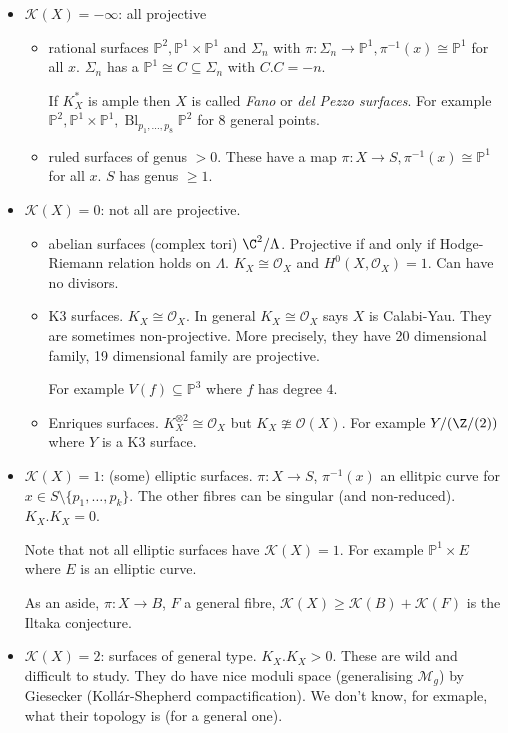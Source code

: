 \documentclass[a4paper]{article}
\renewcommand{\P}{\mathbb P} %
\DeclareMathOperator{\Bl}{Bl} %
\begin{document}
\begin{itemize}
\item \(\mathcal K(X) = -\infty\): all projective
  \begin{itemize}
  \item rational surfaces \(\P^2, \P^1 \times \P^1\) and \(\Sigma_n\) with \(\pi: \Sigma_n \to \P^1, \pi^{-1}(x) \cong \P^1\) for all \(x\). \(\Sigma_n\) has a \(\P^1 \cong C \subseteq \Sigma_n\) with \(C.C = -n\).
    \begin{remark}
      If \(K_X^*\) is ample then \(X\) is called \emph{Fano} or \emph{del Pezzo surfaces}. For example \(\P^2, \P^1 \times \P^1, \Bl_{p_1, \dots, p_8} \P^2\) for 8 general points.
    \end{remark}
  \item ruled surfaces of genus \(> 0\). These have a map \(\pi: X \to S, \pi^{-1}(x) \cong \P^1\) for all \(x\). \(S\) has genus \(\geq 1\).
  \end{itemize}
\item \(\mathcal K(X) = 0\): not all are projective.
  \begin{itemize}
  \item abelian surfaces (complex tori) \(\C^2/\Lambda\). Projective if and only if Hodge-Riemann relation holds on \(\Lambda\). \(K_X \cong \mathcal O_X\) and \(H^0(X, \mathcal O_X) = 1\). Can have no divisors.
  \item K3 surfaces. \(K_X \cong \mathcal O_X\). In general \(K_X \cong \mathcal O_X\) says \(X\) is Calabi-Yau. They are sometimes non-projective. More precisely, they have 20 dimensional family, 19 dimensional family are projective.

    For example \(V(f) \subseteq \P^3\) where \(f\) has degree \(4\).
  \item Enriques surfaces. \(K_X^{\otimes 2} \cong \mathcal O_X\) but \(K_X \ncong \mathcal O(X)\). For example \(Y/(\Z/(2))\) where \(Y\) is a K3 surface.
  \end{itemize}
\item \(\mathcal K(X) = 1\): (some) elliptic surfaces. \(\pi: X \to S\), \(\pi^{-1}(x)\) an ellitpic curve for \(x \in S \setminus \{p_1, \dots, p_k\}\). The other fibres can be singular (and non-reduced). \(K_X . K_X = 0\).

Note that not all elliptic surfaces have \(\mathcal K(X) = 1\). For example \(\P^1 \times E\) where \(E\) is an elliptic curve.

As an aside, \(\pi: X \to B\), \(F\) a general fibre, \(\mathcal K(X) \geq \mathcal K(B) + \mathcal K(F)\) is the Iltaka conjecture.
\item \(\mathcal K(X) = 2\): surfaces of general type. \(K_X . K_X > 0\). These are wild and difficult to study. They do have nice moduli space (generalising \(\mathcal M_g\)) by Giesecker (Kollár-Shepherd compactification). We don't know, for exmaple, what their topology is (for a general one).
\end{itemize}
\end{document}
